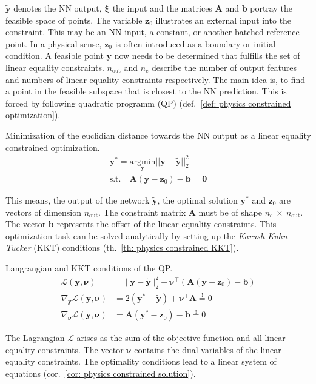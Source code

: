\noindent
$\bm{\tilde{y}}$ denotes the NN output, $\bm{\xi}$ the input and the matrices $\bm{A}$ and $\bm{b}$ portray the feasible space of points.
The variable $\bm{z}_0$ illustrates an external input into the constraint. This may be an NN input, a constant, or another batched 
reference point. In a physical sense, $\bm{z}_0$ is often introduced as a boundary or initial condition.
A feasible point $\bm{y}$ now needs to be determined that fulfills the set of linear equality constraints.
$n_\text{out}$ and $n_\text{c}$ describe the number of output features and numbers
of linear equality constraints respectively. The main idea is, to find a point in the feasible subspace that is closest to the NN prediction. This is 
forced by following quadratic programm (QP) (def.~\ref{def: physics constrained optimization}).

\begin{definition} Minimization of the euclidian distance towards the NN output as a linear equality constrained optimization.
    \label{def: physics constrained optimization}
    \[
        \begin{aligned}
            \bm{y}^* = \underset{\bm{y}}{\mathrm{argmin}} || \bm{y} - \bm{\tilde{y}} ||_2^2 
            \\
            \mathrm{s.t.} \quad \bm{A} (\bm{y} - \bm{z}_0) - \bm{b} = \bm{0}
        \end{aligned}
    \]
\end{definition}
\noindent
This means, the output of the network $\bm{\tilde{y}}$, the optimal solution $\bm{y}^*$ and $\bm{z}_0$ are vectors of
dimension $n_\text{out}$. 
The constraint matrix $\bm{A}$ must be of shape
$n_\text{c}~\times~n_\text{out}$. The vector $\bm{b}$ represents the offset of the linear equality constraints. This optimization
task can be solved analytically by setting up the \emph{Karush-Kuhn-Tucker} (KKT) conditions (th.~\ref{th: physics constrained KKT}).

\begin{theorem} Langrangian and KKT conditions of the QP.
    \label{th: physics constrained KKT}
    \[
        \begin{aligned}
            \mathcal{L}(\bm{y}, \bm{\nu}) &= ||\bm{y} - \bm{\tilde{y}}||_2^2 + \bm{\nu}^\top (\bm{A}(\bm{y}-\bm{z}_0) - \bm{b})
            \\
            \nabla_{\bm{y}} \mathcal{L}(\bm{y}, \bm{\nu}) &= 2(\bm{y}^*-\bm{\tilde{y}}) + \bm{\nu}^\top \bm{A} \overset{!}{=} 0
            \\
            \nabla_{\bm{\nu}} \mathcal{L}(\bm{y}, \bm{\nu}) &= \bm{A} (\bm{y}^* - \bm{z}_0) - \bm{b} \overset{!}{=} 0
        \end{aligned}
    \]
\end{theorem}
\noindent
The Lagrangian $\mathcal{L}$ arises as the sum of the objective function and all linear equality constraints.
The vector $\bm{\nu}$ contains the dual variables of the linear equality constraints.
The optimality conditions lead to a linear system of equations (cor.~\ref{cor: physics constrained solution}).


